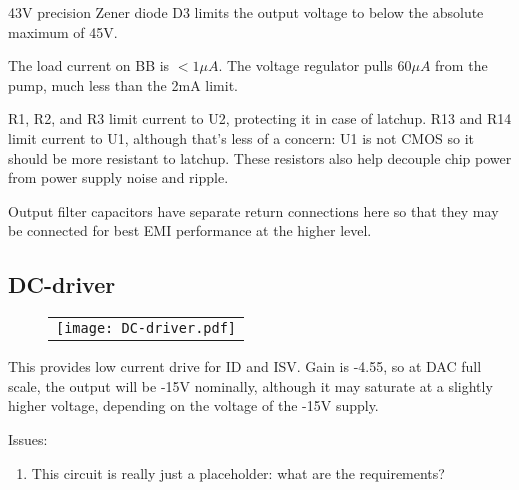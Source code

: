 \documentclass[a4paper,12pt]{article}
\begin{document}
43V precision Zener diode D3 limits the output voltage to below the absolute maximum of 45V.

The load current on BB is $<1\mu A$. The voltage regulator pulls $60\mu A$ from the pump, much less than the 2mA limit.

R1, R2, and R3 limit current to U2, protecting it in case of latchup. R13 and R14 limit current to U1, although that's less of a concern: U1 is not CMOS so it should be more resistant to latchup. These resistors also help decouple chip power from power supply noise and ripple.

Output filter capacitors have separate return connections here so that they may be connected for best EMI performance at the higher level.

%



\subsection{DC-driver}
   \begin{figure}
   \begin{center}
   \begin{tabular}{c}
   \texttt{[image: DC-driver.pdf]}
   \end{tabular}
   \end{center}
   \end{figure}

This provides low current drive for ID and ISV. Gain is -4.55, so at DAC full scale, the output will be -15V nominally, although it may saturate at a slightly higher voltage, depending on the voltage of the -15V supply.


Issues:
\begin{enumerate}
\item
This circuit is really just a placeholder: what are the requirements?
\end{enumerate}
\end{document}
